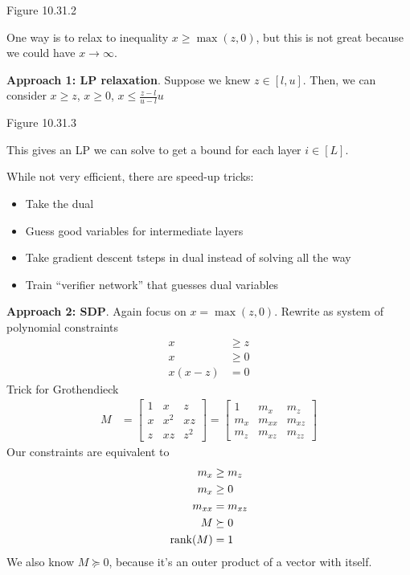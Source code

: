 Figure 10.31.2

One way is to relax to inequality $x \geq \max(z,0)$, but this is not great because
we could have $x \to \infty$.

\textbf{Approach 1: LP relaxation}. Suppose we knew $z \in [l, u]$.
Then, we can consider $x \geq z$, $x \geq 0$, $x \leq \frac{z-l}{u-l}u$

Figure 10.31.3

This gives an LP we can solve to get a bound for each layer $i \in [L]$.

While not very efficient, there are speed-up tricks:
\begin{itemize}
  \item Take the dual
  \item Guess good variables for intermediate layers
  \item Take gradient descent tsteps in dual instead of solving all the way
  \item Train ``verifier network'' that guesses dual variables
\end{itemize}

\textbf{Approach 2: SDP}. Again focus on $x = \max(z,0)$. Rewrite as
system of polynomial constraints
\begin{align}
  x &\geq z \\
  x &\geq 0 \\
  x(x-z) &= 0
\end{align}
Trick for Grothendieck
\begin{align}
  M &= \begin{bmatrix}
    1 & x & z \\
    x & x^2 & xz \\
    z & xz & z^2
  \end{bmatrix}
  = \begin{bmatrix}
    1 & m_x & m_z \\
    m_x & m_{xx} & m_{xz} \\
    m_{z} & m_{xz} & m_{zz}
  \end{bmatrix}
\end{align}
Our constraints are equivalent to
\begin{align}
  m_x &\geq m_z \\
  m_x &\geq 0 \\
  m_{xx} &= m_{xz} \\
  M &\succeq 0 \\
  \operatorname{rank}(M) &= 1
\end{align}
We also know $M \succeq 0$, because it's an outer product of a vector
with itself.


